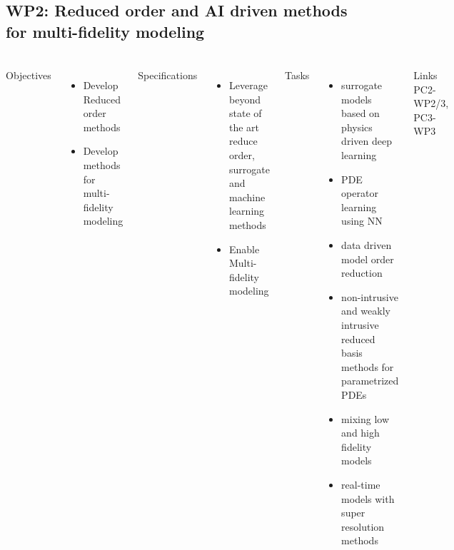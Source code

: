 \subsection{WP2: Reduced order and AI driven methods for multi-fidelity modeling} 
\begin{frame}
  \frametitle{\insertsectionhead}
  \framesubtitle{\insertsubsectionhead}
\footnotesize
  \begin{columns}[t]
    Objectives
    \begin{itemize}
      \item Develop Reduced order methods 
      \item Develop methods for multi-fidelity modeling 
    \end{itemize}

      Specifications
      \begin{itemize}
        \item Leverage beyond state of the art reduce order, surrogate and machine learning methods
        \item Enable Multi-fidelity modeling
      \end{itemize}
    Tasks
    \begin{itemize}
      \item surrogate models based on physics driven deep learning
      \item PDE operator learning using NN
      \item data driven model order reduction
      \item non-intrusive and weakly intrusive reduced basis methods for parametrized PDEs
      \item mixing low and high fidelity models
      \item real-time models with super resolution methods
    \end{itemize}
    \begin{alertblock}{Links}
      PC2-WP2/3, PC3-WP3
    \end{alertblock}

  \end{columns}
\end{frame}

